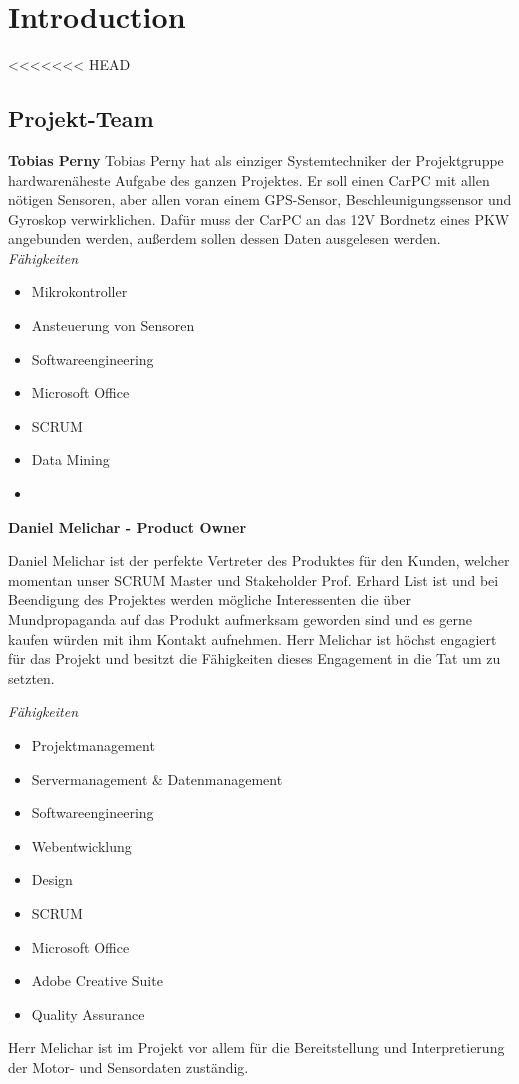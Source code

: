 \chapter{Introduction}


<<<<<<< HEAD
\section{Projekt-Team}
\textbf{Tobias Perny}
Tobias Perny hat als einziger Systemtechniker der Projektgruppe hardwarenäheste Aufgabe des ganzen Projektes. Er soll einen CarPC mit allen nötigen Sensoren, aber allen voran einem GPS-Sensor, Beschleunigungssensor und Gyroskop verwirklichen. Dafür muss der CarPC an das 12V Bordnetz eines PKW angebunden werden, außerdem sollen dessen Daten ausgelesen werden. 
\textit{Fähigkeiten}
\begin{itemize}
	\item Mikrokontroller
	\item Ansteuerung von Sensoren		
	\item Softwareengineering
	\item Microsoft Office
	\item SCRUM
	\item Data Mining
	\item {}
\end{itemize}

\textbf{Daniel Melichar - Product Owner}

Daniel Melichar ist der perfekte Vertreter des Produktes für den Kunden, welcher momentan unser SCRUM Master und Stakeholder Prof. Erhard List ist und bei Beendigung des Projektes werden mögliche Interessenten die über Mundpropaganda auf das Produkt aufmerksam geworden sind und es gerne kaufen würden mit ihm Kontakt aufnehmen. Herr Melichar ist höchst engagiert für das Projekt und besitzt die Fähigkeiten dieses Engagement in die Tat um zu setzten.

\textit{Fähigkeiten}
\begin{itemize}
	\item Projektmanagement
	\item Servermanagement & Datenmanagement				
	\item Softwareengineering
	\item Webentwicklung
	\item Design
	\item SCRUM
	\item Microsoft Office
	\item Adobe Creative Suite
	\item Quality Assurance
\end{itemize}
Herr Melichar ist im Projekt vor allem für die Bereitstellung und Interpretierung der Motor- und Sensordaten zuständig. 


